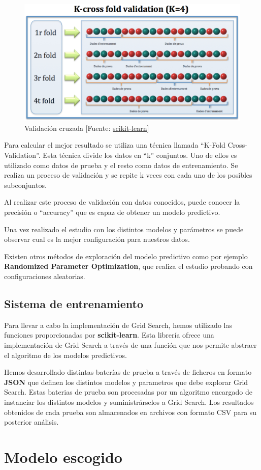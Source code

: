 	\begin{figure}[htb]
		\begin{center}
			\includegraphics[width=4.5in]{figures/Cross-Validation.jpg}
			\caption{Validación cruzada [Fuente: \href{www.scikit-learn.org}{scikit-learn}]}
		\end{center}
		\label{cross}
	\end{figure}

	Para calcular el mejor resultado se utiliza una técnica llamada ``K-Fold Cross-Validation''. Esta técnica divide los datos en ``k'' conjuntos. Uno de ellos es utilizado como datos de prueba y el resto como datos de entrenamiento. Se realiza un proceso de validación y se repite k veces con cada uno de los posibles subconjuntos.

	Al realizar este proceso de validación con datos conocidos, puede conocer la precisión o ``accuracy'' que es capaz de obtener un modelo predictivo.

	Una vez realizado el estudio con los distintos modelos y parámetros se puede observar cual es la mejor configuración para nuestros datos.
	
	Existen otros métodos de exploración del modelo predictivo como por ejemplo \textbf{Randomized Parameter Optimization}, que realiza el estudio probando con configuraciones aleatorias.

	\subsection{Sistema de entrenamiento}
	Para llevar a cabo la implementación de Grid Search, hemos utilizado las funciones proporcionadas por \textbf{scikit-learn}.
	Esta librería ofrece una implementación de Grid Search a través de una función que nos permite abstraer el algoritmo de los modelos predictivos.

	Hemos desarrollado distintas baterías de prueba a través de ficheros en formato \textbf{JSON} que definen los distintos modelos y parametros que debe explorar Grid Search.
	Estas baterias de prueba son procesadas por un algoritmo encargado de instanciar los distintos modelos y suministrárselos a Grid Search.
	Los resultados obtenidos de cada prueba son almacenados en archivos con formato CSV para su posterior análisis.

\section{Modelo escogido}
\label{makereference4.5}
